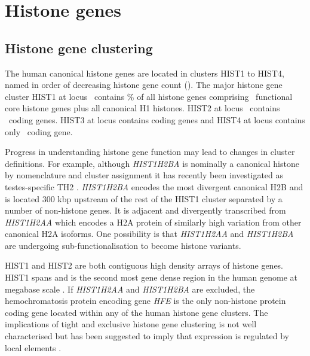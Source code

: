 \section{Histone genes}

\subsection{Histone gene clustering}
	The human canonical histone genes are located in clusters HIST1 to HIST4, 
	named in order of decreasing histone gene count ().
	The major histone gene cluster HIST1 at locus~\HISTOneLocus{}  
	contains \% of all histone genes 
	comprising \CodingGenesInHISTOne{}~functional core histone genes plus all canonical H1 histones. 
	HIST2 at locus~\HISTTwoLocus{} contains \CodingGenesInHISTTwo{}~coding genes. 
	HIST3 at locus \HISTThreeLocus{} contains \CodingGenesInHISTThree{} coding genes 
	and HIST4 at locus \HISTFourLocus{} contains only \CodingGenesInHISTFour{}~coding gene. 

	Progress in understanding histone gene function may lead to changes in cluster definitions. 
	For example, although \textit{HIST1H2BA} is nominally a canonical histone 
	by nomenclature and cluster assignment
	it has recently been investigated as testes-specific TH2 \citep{Urahama2014}.
	\textit{HIST1H2BA} encodes the most divergent canonical H2B 
	and is located 300 kbp upstream of the rest of the HIST1 cluster 
	separated by a number of non-histone genes. 
	It is adjacent and divergently transcribed from \textit{HIST1H2AA} 
	which encodes a H2A protein of similarly high variation from other canonical H2A isoforms. 
	One possibility is that \textit{HIST1H2AA} and \textit{HIST1H2BA} 
	are undergoing sub-functionalisation to become histone variants.

	HIST1 and HIST2 are both contiguous high density arrays of histone genes. 
	HIST1 spans \HISTOneSpan{} 
	and is the second most gene dense region in the human genome at megabase scale \citep{MHC-III-analysis}.
	If \textit{HIST1H2AA} and \textit{HIST1H2BA} are excluded, 
	the hemochromatosis protein encoding gene \textit{HFE} \citep{AlbigDoenecke1998} 
	is the only non-histone protein coding gene located within any of the human histone gene clusters. 
	The implications of tight and exclusive histone gene clustering 
	is not well characterised \citep{Eirinlopez2009}
	but has been suggested to imply that expression is regulated by local elements \citep{close-regulators}.

